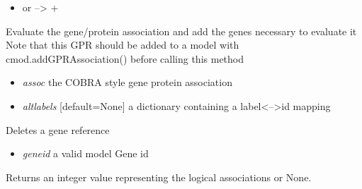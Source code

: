 \documentclass[a4paper,11pt,english]{sphinxmanual}
\begin{document}
\begin{fulllineitems}
\begin{fulllineitems}
\begin{itemize}
\item {} 
or --\textgreater{} +

\end{itemize}

\end{fulllineitems}


\begin{fulllineitems}
\label{modules_doc:cbmpy.CBModel.GeneProteinAssociation.createAssociationAndGeneRefs}
Evaluate the gene/protein association and add the genes necessary to evaluate it
Note that this GPR should be added to a model with cmod.addGPRAssociation() before calling this method
\begin{itemize}
\item {} 
\emph{assoc} the COBRA style gene protein association

\item {} 
\emph{altlabels} {[}default=None{]} a dictionary containing a label\textless{}--\textgreater{}id mapping

\end{itemize}

\end{fulllineitems}


\begin{fulllineitems}
\label{modules_doc:cbmpy.CBModel.GeneProteinAssociation.deleteGeneref}
Deletes a gene reference
\begin{itemize}
\item {} 
\emph{geneid} a valid model Gene id

\end{itemize}

\end{fulllineitems}


\begin{fulllineitems}
\label{modules_doc:cbmpy.CBModel.GeneProteinAssociation.evalAssociation}
Returns an integer value representing the logical associations or None.


\end{fulllineitems}
\end{fulllineitems}
\end{document}
